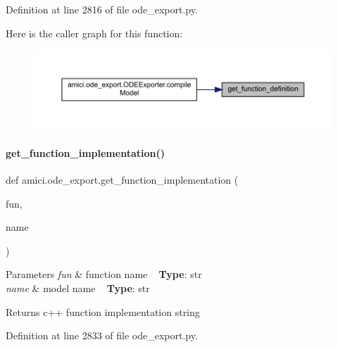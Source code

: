 Definition at line 2816 of file ode\+\_\+export.\+py.

Here is the caller graph for this function\+:
\nopagebreak
\begin{figure}[H]
\begin{center}
\leavevmode
\includegraphics[width=350pt]{namespaceamici_1_1ode__export_a128fdb36a0dd6b83a170543ff04659e0_icgraph}
\end{center}
\end{figure}
\mbox{\label{namespaceamici_1_1ode__export_a186e3d3705236051c7d43bbd0a91ea08}} 
\paragraph{\texorpdfstring{get\_function\_implementation()}{get\_function\_implementation()}}
{\footnotesize\ttfamily def amici.\+ode\+\_\+export.\+get\+\_\+function\+\_\+implementation (\begin{DoxyParamCaption}\item[{}]{fun,  }\item[{}]{name }\end{DoxyParamCaption})}


\begin{DoxyParams}{Parameters}
{\em fun} & function name ~\newline
{\bfseries{Type}}\+: str \\
\hline
{\em name} & model name ~\newline
{\bfseries{Type}}\+: str\\
\hline
\end{DoxyParams}
\begin{DoxyReturn}{Returns}
c++ function implementation string 
\end{DoxyReturn}


Definition at line 2833 of file ode\+\_\+export.\+py.

